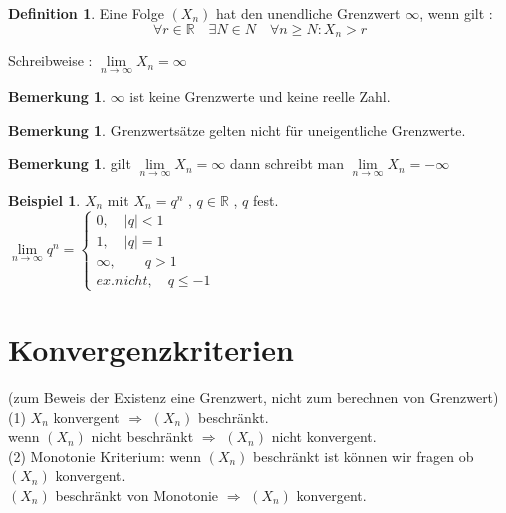 \documentclass[a4paper,12pt,leqno]{report}
\theoremstyle{plain} %
\theoremstyle{definition} %
\newtheorem{remark}[theorem]{Bemerkung}
\newtheorem{definition}[theorem]{Definition}
\newtheorem{example}[theorem]{Beispiel}
\begin{document}
\begin{definition}
Eine Folge $(X_n)$ hat den unendliche Grenzwert $\infty$, wenn gilt : \\
\[\forall r \in \mathbb{R} \quad \exists N \in N \quad \forall n \geq N : X_n > r \]

Schreibweise : $\lim\limits_{n \rightarrow \infty}{X_n}= \infty$  
\end{definition}

\begin{remark}
$\infty$ ist keine Grenzwerte und keine reelle Zahl.    
\end{remark}

\begin{remark}
Grenzwertsätze gelten nicht für uneigentliche Grenzwerte.     
\end{remark}

\begin{remark}
gilt $\lim\limits_{n \rightarrow \infty}{X_n}= \infty$ dann schreibt man $\lim\limits_{n \rightarrow \infty}{X_n}= -\infty$
\end{remark}

\begin{example}
$X_n$ mit $X_n = q^n$ , $q \in \mathbb{R}$ , $q$ fest.\\

$ \lim\limits_{n \rightarrow \infty}{q^n} = \begin{cases}
0 ,\quad |q|<1 \\ 
1 ,\quad |q|=1 \\
\infty ,\quad\quad q > 1  \\ 
ex. nicht ,\quad q\leq -1 
\end{cases}$
\end{example}


\section{Konvergenzkriterien}
(zum Beweis der Existenz eine Grenzwert, nicht zum berechnen von Grenzwert) \\


(1) $X_n$ konvergent $\Rightarrow$ $(X_n)$ beschränkt. \\

wenn $(X_n)$ nicht beschränkt $\Rightarrow$ $(X_n)$ nicht konvergent.\\


(2) Monotonie Kriterium:
wenn $(X_n)$ beschränkt ist können wir fragen ob $(X_n)$    konvergent.\\


$(X_n)$ beschränkt von Monotonie $\Rightarrow$ $(X_n)$ konvergent.  
\end{document}
